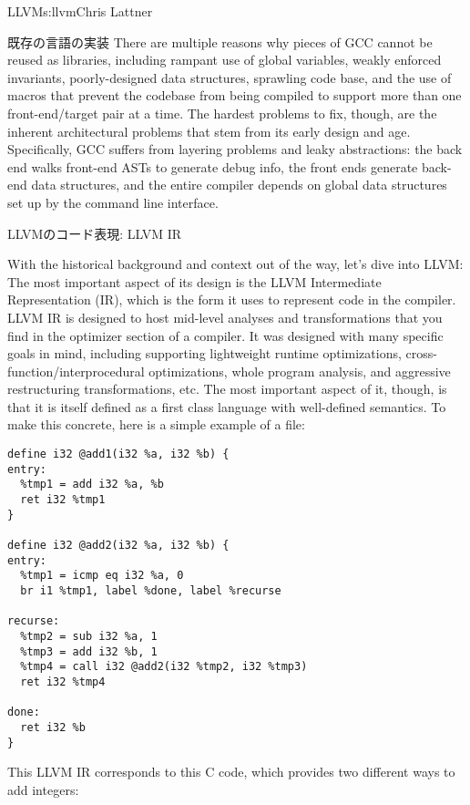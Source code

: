 \begin{aosachapter}{LLVM}{s:llvm}{Chris Lattner}
\begin{aosasect1}{既存の言語の実装}
There are multiple reasons why pieces of GCC cannot be reused as
libraries, including rampant use of global variables, weakly enforced
invariants, poorly-designed data structures, sprawling code base, and
the use of macros that prevent the codebase from being compiled to
support more than one front-end/target pair at a time.  The hardest
problems to fix, though, are the inherent architectural problems that
stem from its early design and age.  Specifically, GCC suffers from
layering problems and leaky abstractions: the back end walks front-end
ASTs to generate debug info, the front ends generate back-end data
structures, and the entire compiler depends on global data structures
set up by the command line interface.

\end{aosasect1}

\begin{aosasect1}{LLVMのコード表現: LLVM IR}

With the historical background and context out of the way, let's dive
into LLVM: The most important aspect of its design is the LLVM
Intermediate Representation (IR), which is the form it uses to
represent code in the compiler.  LLVM IR is designed to host mid-level
analyses and transformations that you find in the optimizer section of
a compiler.  It was designed with many specific goals in mind,
including supporting lightweight runtime optimizations,
cross-function/interprocedural optimizations, whole program analysis,
and aggressive restructuring transformations, etc.  The most important
aspect of it, though, is that it is itself defined as a first class
language with well-defined semantics. To make this concrete, here is a
simple example of a  file:

\begin{verbatim}
define i32 @add1(i32 %a, i32 %b) {
entry:
  %tmp1 = add i32 %a, %b
  ret i32 %tmp1
}

define i32 @add2(i32 %a, i32 %b) {
entry:
  %tmp1 = icmp eq i32 %a, 0
  br i1 %tmp1, label %done, label %recurse

recurse:
  %tmp2 = sub i32 %a, 1
  %tmp3 = add i32 %b, 1
  %tmp4 = call i32 @add2(i32 %tmp2, i32 %tmp3)
  ret i32 %tmp4

done:
  ret i32 %b
}
\end{verbatim}

\noindent This LLVM IR corresponds to this C code, which provides two different
ways to add integers:


\end{aosasect1}
\end{aosachapter}
